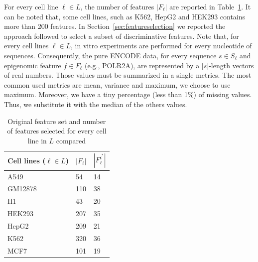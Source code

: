 For every cell line $\ell \in L$, the number of features $| F_\ell |$ are reported in Table~\ref{tab:featuressize}. It can be noted that, some cell lines, such as K562, HepG2 and HEK293 contains more than 200 features. In Section~\ref{sec:featureselection} we reported the approach followed to select a subset of discriminative features.
Note that, for every cell lines $\ell \in L$, in vitro experiments are
performed for every nucleotide of sequences. Consequently, the pure ENCODE
data, for every sequence $s \in S_\ell$ and epigenomic feature $f \in
F_\ell$ (e.g., POLR2A), are represented by a $|s|$-length vectors of real
numbers. Those values must be summarized in a single metrics. The most
common used metrics are mean, variance and maximum, we choose to use
maximum. Moreover, we have a tiny percentage (less than 1\%) of
missing values. Thus, we substitute it with the median of the others values.
\begin{table}[t]
\centering
\begin{tabular}{|l|l|l|}
\hline
\textbf{Cell lines ($\ell \in L$)} & \textbf{$|F_\ell|$} & \textbf{$|F_\ell^{i^{*}}|$} \\ \hline
A549               & 54 & 14                  \\ \hline
GM12878            & 110 & 38                 \\ \hline
H1                 & 43 & 20                  \\ \hline
HEK293             & 207 & 35                 \\ \hline
HepG2              & 209 & 21                 \\ \hline
K562               & 320 & 36                 \\ \hline
MCF7               & 101 & 19                 \\ \hline
\end{tabular}
\caption{Original feature set and number of features selected for every cell line in $L$ compared}
\label{tab:featuressize}
\end{table}
